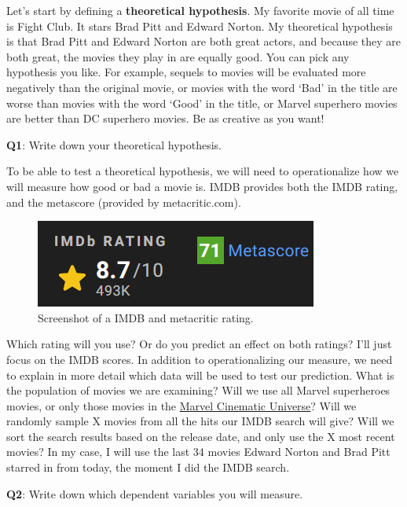 \documentclass[
  oneside]{krantz}
\begin{document}
Let's start by defining a \textbf{theoretical hypothesis}. My favorite movie of all time is Fight Club. It stars Brad Pitt and Edward Norton. My theoretical hypothesis is that Brad Pitt and Edward Norton are both great actors, and because they are both great, the movies they play in are equally good. You can pick any hypothesis you like. For example, sequels to movies will be evaluated more negatively than the original movie, or movies with the word `Bad' in the title are worse than movies with the word `Good' in the title, or Marvel superhero movies are better than DC superhero movies. Be as creative as you want!

\textbf{Q1}: Write down your theoretical hypothesis.

To be able to test a theoretical hypothesis, we will need to operationalize how we will measure how good or bad a movie is. IMDB provides both the IMDB rating, and the metascore (provided by metacritic.com).



\begin{figure}

{\centering \includegraphics[width=0.4\linewidth]{images/imdbrating} 

}

\caption{Screenshot of a IMDB and metacritic rating.}\label{fig:imdbrating}
\end{figure}

Which rating will you use? Or do you predict an effect on both ratings? I'll just focus on the IMDB scores. In addition to operationalizing our measure, we need to explain in more detail which data will be used to test our prediction. What is the population of movies we are examining? Will we use all Marvel superheroes movies, or only those movies in the \href{https://en.wikipedia.org/wiki/List_of_Marvel_Cinematic_Universe_films}{Marvel Cinematic Universe}? Will we randomly sample X movies from all the hits our IMDB search will give? Will we sort the search results based on the release date, and only use the X most recent movies? In my case, I will use the last 34 movies Edward Norton and Brad Pitt starred in from today, the moment I did the IMDB search.

\textbf{Q2}: Write down which dependent variables you will measure.
\end{document}
